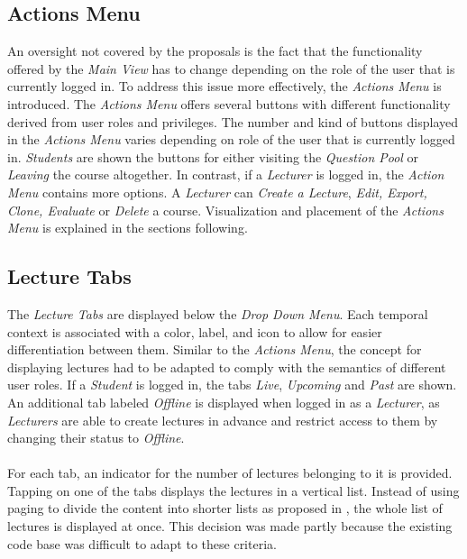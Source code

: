 \subsection{Actions Menu}
An oversight not covered by the proposals is the fact that the functionality offered by the \emph{Main View} has to change depending on the role of the user that is currently logged in. To address this issue more effectively, the \emph{Actions Menu} is introduced.
The \emph{Actions Menu} offers several buttons with different functionality derived from user roles and privileges.
The number and kind of buttons displayed in the \emph{Actions Menu} varies depending on role of the user that is currently logged in. \emph{Students} are shown the buttons for either visiting the \emph{Question Pool} or \emph{Leaving} the course altogether. In contrast, if a \emph{Lecturer} is logged in, the \emph{Action Menu} contains more options. A \emph{Lecturer} can \emph{Create a Lecture}, \emph{Edit, Export, Clone, Evaluate } or \emph{Delete} a course. Visualization and placement of the \emph{Actions Menu} is explained in the sections following.


\subsection{Lecture Tabs}
The \emph{Lecture Tabs} are displayed below the \emph{Drop Down Menu}. Each temporal context is associated with a color, label, and icon to allow for easier differentiation between them. Similar to the \emph{Actions Menu}, the concept for displaying lectures had to be adapted to comply with the semantics of different user roles.
If a \emph{Student} is logged in, the tabs \emph{Live}, \emph{Upcoming} and \emph{Past} are shown. An additional tab labeled \emph{Offline} is displayed when logged in as a \emph{Lecturer}, as \emph{Lecturers} are able to create lectures in advance and restrict access to them by changing their status to \emph{Offline}.
\\
\\
For each tab, an indicator for the number of lectures belonging to it is provided.
Tapping on one of the tabs displays the lectures in a vertical list. Instead of using paging to divide the content into shorter lists as proposed in , the whole list of lectures is displayed at once.
This decision was made partly because the existing code base was difficult to adapt to these criteria.

